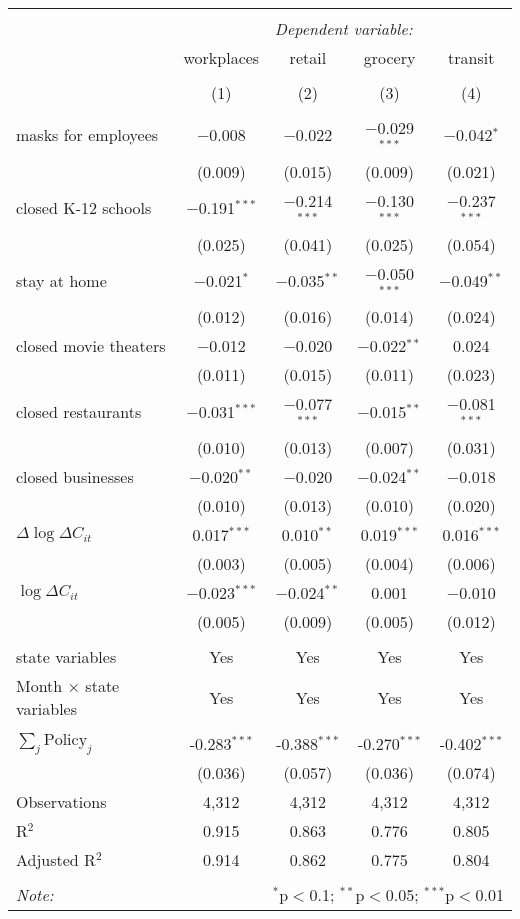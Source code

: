\begin{tabular}{@{\extracolsep{1pt}}lcccc} 
\\[-1.8ex]\hline 
\hline \\[-1.8ex] 
 & \multicolumn{4}{c}{\textit{Dependent variable:}} \\ 
\cline{2-5} 
 & workplaces & retail & grocery & transit \\ 
\\[-1.8ex] & (1) & (2) & (3) & (4)\\ 
\hline \\[-1.8ex] 
 masks for employees & $-$0.008 & $-$0.022 & $-$0.029$^{***}$ & $-$0.042$^{*}$ \\ 
  & (0.009) & (0.015) & (0.009) & (0.021) \\ 
  closed K-12 schools & $-$0.191$^{***}$ & $-$0.214$^{***}$ & $-$0.130$^{***}$ & $-$0.237$^{***}$ \\ 
  & (0.025) & (0.041) & (0.025) & (0.054) \\ 
  stay at home & $-$0.021$^{*}$ & $-$0.035$^{**}$ & $-$0.050$^{***}$ & $-$0.049$^{**}$ \\ 
  & (0.012) & (0.016) & (0.014) & (0.024) \\ 
  closed movie theaters & $-$0.012 & $-$0.020 & $-$0.022$^{**}$ & 0.024 \\ 
  & (0.011) & (0.015) & (0.011) & (0.023) \\ 
  closed restaurants & $-$0.031$^{***}$ & $-$0.077$^{***}$ & $-$0.015$^{**}$ & $-$0.081$^{***}$ \\ 
  & (0.010) & (0.013) & (0.007) & (0.031) \\ 
  closed businesses & $-$0.020$^{**}$ & $-$0.020 & $-$0.024$^{**}$ & $-$0.018 \\ 
  & (0.010) & (0.013) & (0.010) & (0.020) \\ 
  $\Delta \log \Delta C_{it}$ & 0.017$^{***}$ & 0.010$^{**}$ & 0.019$^{***}$ & 0.016$^{***}$ \\ 
  & (0.003) & (0.005) & (0.004) & (0.006) \\ 
  $\log \Delta C_{it}$ & $-$0.023$^{***}$ & $-$0.024$^{**}$ & 0.001 & $-$0.010 \\ 
  & (0.005) & (0.009) & (0.005) & (0.012) \\ 
 \hline \\[-1.8ex] 
state variables & Yes & Yes & Yes & Yes \\ 
Month $\times$ state variables & Yes & Yes & Yes & Yes \\ 
\hline \\[-1.8ex] 
$\sum_j \mathrm{Policy}_j$ & -0.283$^{***}$ & -0.388$^{***}$ & -0.270$^{***}$ & -0.402$^{***}$ \\ 
 & (0.036) & (0.057) & (0.036) & (0.074) \\ 
Observations & 4,312 & 4,312 & 4,312 & 4,312 \\ 
R$^{2}$ & 0.915 & 0.863 & 0.776 & 0.805 \\ 
Adjusted R$^{2}$ & 0.914 & 0.862 & 0.775 & 0.804 \\ 
\hline 
\hline \\[-1.8ex] 
\textit{Note:}  & \multicolumn{4}{r}{$^{*}$p$<$0.1; $^{**}$p$<$0.05; $^{***}$p$<$0.01} \\ 
\end{tabular} 
